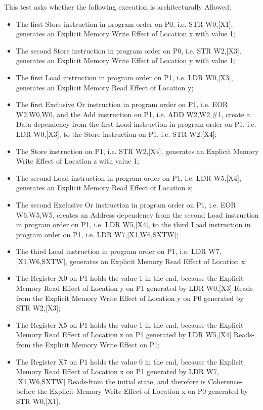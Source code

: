 This test asks whether the following execution is architecturally Allowed:

\begin{itemize}
  \item The first Store instruction in program order on P0, i.e. STR W0,[X1], generates an Explicit Memory Write Effect of Location x with value 1;
  \item The second Store instruction in program order on P0, i.e. STR W2,[X3], generates an Explicit Memory Write Effect of Location y with value 1;
  \item The first Load instruction in program order on P1, i.e. LDR W0,[X3], generates an Explicit Memory Read Effect of Location y;
  \item The first Exclusive Or instruction in program order on P1, i.e. EOR W2,W0,W0, and the Add instruction on P1, i.e. ADD W2,W2,\#1, create a Data dependency from the first Load instruction in program order on P1, i.e. LDR W0,[X3], to the Store instruction on P1, i.e. STR W2,[X4];
  \item The Store instruction on P1, i.e. STR W2,[X4], generates an Explicit Memory Write Effect of Location z with value 1;
  \item The second Load instruction in program order on P1, i.e. LDR W5,[X4], generates an Explicit Memory Read Effect of Location z;
  \item The second Exclusive Or instruction in program order on P1, i.e. EOR W6,W5,W5, creates an Address dependency from the second Load instruction in program order on P1, i.e. LDR W5,[X4], to the third Load instruction in program order on P1, i.e. LDR W7,[X1,W6,SXTW];
  \item The third Load instruction in program order on P1, i.e. LDR W7,[X1,W6,SXTW], generates an Explicit Memory Read Effect of Location x;
  \item The Register X0 on P1 holds the value 1 in the end, because the Explicit Memory Read Effect of Location y on P1 generated by LDR W0,[X3] Reads-from the Explicit Memory Write Effect of Location y on P0 generated by STR W2,[X3];
  \item The Register X5 on P1 holds the value 1 in the end, because the Explicit Memory Read Effect of Location z on P1 generated by LDR W5,[X4] Reads-from the Explicit Memory Write Effect on P1;
  \item The Register X7 on P1 holds the value 0 in the end, because the Explicit Memory Read Effect of Location x on P1 generated by LDR W7,[X1,W6,SXTW] Reads-from the initial state, and therefore is Coherence-before the Explicit Memory Write Effect of Location x on P0 generated by STR W0,[X1].
\end{itemize}
